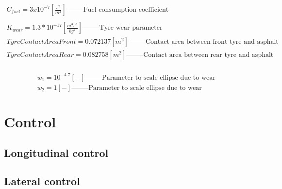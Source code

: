 \documentclass{report}
\let\Oldsection\section
\renewcommand{\section}{\FloatBarrier\Oldsection}
\begin{document}
\begin{equation*}
\begin{aligned}
C_{fuel} = 3x10^{-7} [\frac{s^2}{m^2}] \text{--------Fuel consumption coefficient}\\\\
K_{wear} = 1.3*10^{-17} [\frac{m^3s^3}{kg^2}] \text{--------Tyre wear parameter}\\
Tyre Contact Area Front = 0.072137 [m^2] \text{--------Contact area between front tyre and asphalt}\\
Tyre Contact Area Rear = 0.082758 [m^2] \text{--------Contact area between rear tyre and asphalt}\\
\end{aligned}
\end{equation*}

\begin{equation*}
\begin{aligned}
w_1 = 10^{-4.7} [-] \text{--------Parameter to scale ellipse due to wear}\\
w_2 = 1 [-] \text{--------Parameter to scale ellipse due to wear}
\end{aligned}
\end{equation*}

\chapter{Control}
\section{Longitudinal control}
\section{Lateral control}
\end{document}
